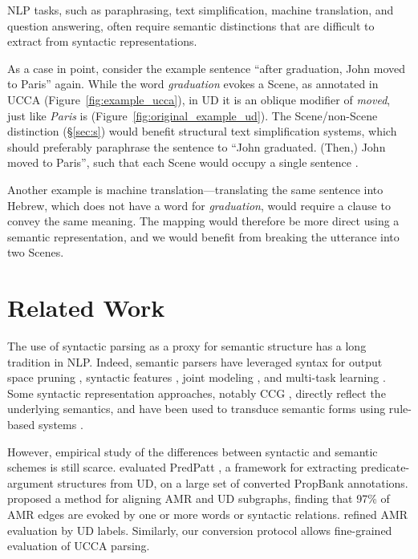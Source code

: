 \documentclass[11pt,a4paper,table]{article}
\begin{document}
NLP tasks, such as paraphrasing, text simplification, machine translation, and question answering,
often require semantic distinctions that are difficult to extract from syntactic representations.

As a case in point, consider the example sentence
``after graduation, John moved to Paris'' again.
While the word \textit{graduation} evokes a Scene, as annotated in UCCA
(Figure~\ref{fig:example_ucca}), in UD it is an oblique modifier of \textit{moved},
just like \textit{Paris} is (Figure~\ref{fig:original_example_ud}).
The Scene/non-Scene distinction (\S\ref{sec:s})
would benefit structural text simplification systems,
which should preferably paraphrase the sentence to
``John graduated. (Then,) John moved to Paris'',
such that each Scene would occupy a single sentence \cite{sulem2018samsa}.

Another example is machine translation---translating the same sentence into Hebrew,
which does not have a word for \textit{graduation},
would require a clause to convey the same meaning.
The mapping would therefore be more direct using a semantic representation,
and we would benefit from breaking the utterance into two Scenes.


\section{Related Work}\label{sec:related_work}

The use of syntactic parsing as a proxy for semantic structure has a long tradition in NLP.
Indeed, semantic parsers have leveraged syntax
for output space pruning \cite{xue2004calibrating}, 
syntactic features \cite{gildea2002automatic,N15-1007,E17-1045}, 
joint modeling \cite{surdeanu2008conll,hajivc2009conll}, and
multi-task learning \cite{swayamdipta2016greedy,swayamdipta2018syntactic,strubell2018linguistically}.
Some syntactic representation approaches, notably CCG \cite{Steedman:00},
directly reflect the underlying semantics, and have been used to
transduce semantic forms using rule-based systems \cite{Basile:12}.
  
However, empirical study of
the differences between syntactic and semantic schemes is still scarce.
 evaluated PredPatt \citep{white2016universal},
a framework for extracting predicate-argument structures from UD,
on a large set of converted PropBank annotations.
 proposed a method for aligning AMR and UD subgraphs,
finding that 97\% of AMR edges are evoked by one or more
words or syntactic relations.
 refined AMR evaluation by UD labels.
Similarly, our conversion protocol allows fine-grained evaluation of UCCA parsing.
\end{document}
